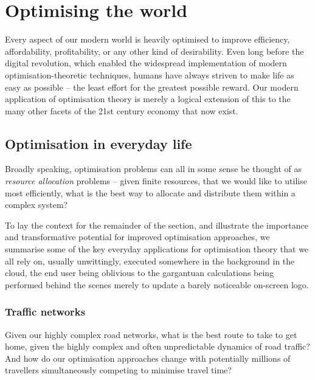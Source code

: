 %
%

\section{Optimising the world}\label{sec:optimising_the_world}

Every aspect of our modern world is heavily optimised to improve efficiency, affordability, profitability, or any other kind of desirability. Even long before the digital revolution, which enabled the widespread implementation of modern optimisation-theoretic techniques, humans have always striven to make life as easy as possible -- the least effort for the greatest possible reward. Our modern application of optimisation theory is merely a logical extension of this to the many other facets of the 21st century economy that now exist.

\subsection{Optimisation in everyday life}

Broadly speaking, optimisation problems can all in some sense be thought of as \textit{resource allocation} problems -- given finite resources, that we would like to utilise most efficiently, what is the best way to allocate and distribute them within a complex system?

To lay the context for the remainder of the section, and illustrate the importance and transformative potential for improved optimisation approaches, we summarise some of the key everyday applications for optimisation theory that we all rely on, usually unwittingly, executed somewhere in the background in the cloud, the end user being oblivious to the gargantuan calculations being performed behind the scenes merely to update a barely noticeable on-screen logo.

\subsubsection{Traffic networks}

Given our highly complex road networks, what is the best route to take to get home, given the highly complex and often unpredictable dynamics of road traffic? And how do our optimisation approaches change with potentially millions of travellers simultaneously competing to minimise travel time?

